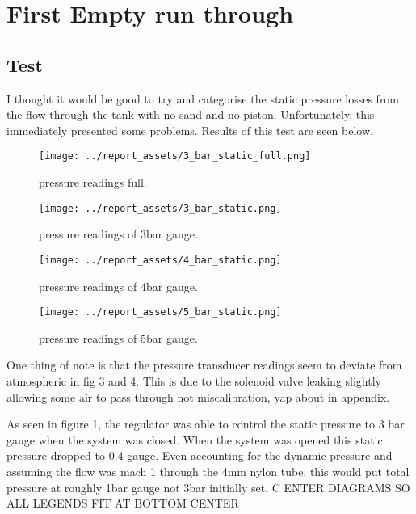\section{First Empty run through}\label{sec:static_test}
\subsection{Test}
I thought it would be good to try and categorise the static pressure losses from the flow through the tank with no sand and no piston. Unfortunately, this immediately presented some problems. Results of this test are seen below.
\begin{figure}[htbp]
    \centering

    \begin{minipage}{0.45\textwidth}
        \centering
        \texttt{[image: ../report\_assets/3\_bar\_static\_full.png]}
        \caption{pressure readings full.}\label{fig:static-pressure-drop-3bar_full}
    \end{minipage}
    \hfill
    \begin{minipage}{0.45\textwidth}
        \centering
        \texttt{[image: ../report\_assets/3\_bar\_static.png]}
        \caption{pressure readings of 3bar gauge.}\label{fig:static-pressure-drop-3bar}
    \end{minipage}
    \begin{minipage}{0.45\textwidth}
        \centering
        \texttt{[image: ../report\_assets/4\_bar\_static.png]}
        \caption{pressure readings of 4bar gauge.}\label{fig:static-pressure-drop-4bar}
    \end{minipage}
    \hfill
    \begin{minipage}{0.45\textwidth}
        \centering
        \texttt{[image: ../report\_assets/5\_bar\_static.png]}
        \caption{pressure readings of 5bar gauge.}\label{fig:static-pressure-drop-5bar}
    \end{minipage}


\end{figure}
One thing of note is that the pressure transducer readings seem to deviate from atmospheric in fig 3 and 4. This is due to the solenoid valve leaking slightly allowing some air to pass through not miscalibration, yap about in appendix.

As seen in figure 1, the regulator was able to control the static pressure to 3 bar gauge when the system was closed. When the system was opened this static pressure dropped to 0.4 gauge. Even accounting for the dynamic pressure and assuming the flow was mach 1 through the 4mm nylon tube, this would put total pressure at roughly 1bar gauge not 3bar initially set.
C
ENTER DIAGRAMS SO ALL LEGENDS FIT AT BOTTOM CENTER
